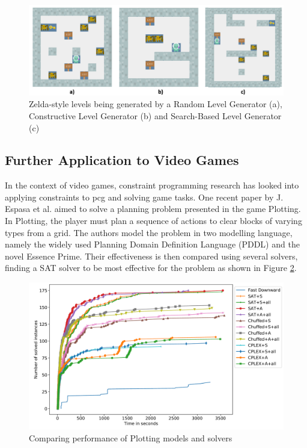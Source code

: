 \begin{figure}[H]
    \centering
    \includegraphics[width=\textwidth, height=0.3\textheight, keepaspectratio]{Images/GVGAILevels.png}
    \caption{Zelda-style levels being generated by a Random Level Generator (a), Constructive Level Generator (b) and Search-Based Level Generator (c) \cite{GVG-AI_and_VGDL_Level_Generators}}
    \label{fig:gvgAILevels}
\end{figure}

\subsection{Further Application to Video Games}
In the context of video games, constraint programming research has looked into applying constraints to \acrshort{pcg} and solving game tasks. One recent paper by J. Espasa et al. \cite{Plotting_Planning_Problem} aimed to solve a planning problem presented in the game Plotting. In Plotting, the player must plan a sequence of actions to clear blocks of varying types from a grid. The authors model the problem in two modelling language, namely the widely used Planning Domain Definition Language (PDDL) and the novel Essence Prime. Their effectiveness is then compared using several solvers, finding a SAT solver to be most effective for the problem as shown in Figure \ref{fig:plottingSolverComparison}.

\begin{figure}[H]
    \centering
    \includegraphics[width=\textwidth, height=0.3\textheight, keepaspectratio]{Images/PlottingSolverComparison.png}
    \caption{Comparing performance of Plotting models and solvers \cite{Plotting_Planning_Problem}}
    \label{fig:plottingSolverComparison}
\end{figure}

